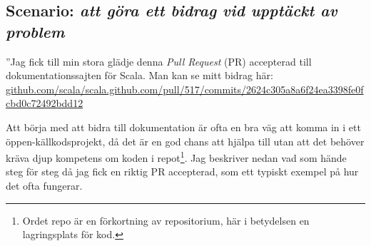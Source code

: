 \subsection*{Scenario: \emph{att göra ett bidrag vid upptäckt av problem}}

''Jag fick till min stora glädje denna \emph{Pull Request} (PR) accepterad till dokumentationssajten för Scala. Man kan se mitt bidrag här:\\
\href{https://github.com/scala/scala.github.com/pull/517/commits/2624c305a8a6f24ea3398fe0fcbd0c72492bdd12}{\small github.com/scala/scala.github.com/pull/517/commits/2624c305a8a6f24ea3398fe0fcbd0c72492bdd12}

Att börja med att bidra till dokumentation är ofta en bra väg att komma in i ett öppen-källkodsprojekt, då det är en god chans att hjälpa till utan att det behöver kräva djup kompetens om koden i repot\footnote{Ordet repo är en förkortning av repositorium, här i betydelsen en lagringsplats för kod.}. Jag beskriver nedan vad som hände steg för steg då jag fick en riktig PR accepterad, som ett typiskt exempel på hur det ofta fungerar.

